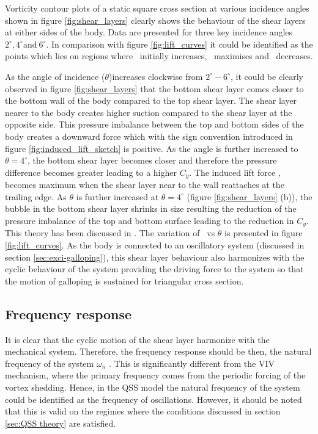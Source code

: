 Vorticity contour plots of a static square cross section at various incidence angles shown in figure \ref{fig:shear_layers} clearly shows the behaviour of the shear layers at either sides of the body. Data are presented for three key incidence angles $2^{\circ}, 4^{\circ} \text{and}\ 6^{\circ}$. In comparison with figure \ref{fig:lift_curves} it could be identified as the points which lies on regions where \cy\ initially increases, \cy\ maximises and \cy\ decreases. 

As the angle of incidence ($\theta$)increases clockwise from $2^{\circ}-6^{\circ}$, it could be clearly observed in figure \ref{fig:shear_layers} that the bottom shear layer comes closer to the bottom wall of the body compared to the top shear layer. The shear layer nearer to the body creates higher suction compared to the shear layer at the opposite side. This pressure imbalance between the top and bottom sides of the body creates a downward force which with the sign convention introduced in figure \ref{fig:induced_lift_sketch} is positive. As the angle is further increased to $\theta=4^{\circ}$, the bottom shear layer becomes closer and therefore the pressure difference becomes greater leading to a higher $C_{y}$. The induced lift force \cy, becomes maximum when the shear layer near to the wall reattaches at the trailing edge. As $\theta$ is further increased at  $\theta=4^{\circ}$ (figure \ref{fig:shear_layers} (b)), the bubble in the bottom shear layer shrinks in size resulting the reduction of the pressure imbalance of the top and bottom surface leading to the reduction in $C_{y}$. This theory has been discussed in \citet{Parkinson1989}. The variation of \cy\ vs $\theta$ is presented in figure \ref{fig:lift_curves}. As the body is connected to an oscillatory system (discussed in section \ref{sec:exci-galloping}), this shear layer behaviour also harmonizes with the cyclic behaviour of the system providing the driving force to the system so that the motion of galloping is sustained for triangular cross section.



\subsection{Frequency response}
 
 It is clear that the cyclic motion of the shear layer harmonize with the mechanical system. Therefore, the frequency response should be then, the natural frequency of the system $\omega_{n}$ \citep{Paidoussis2010}. This is significantly different from the VIV mechanism, where the primary frequency comes from the periodic forcing of the vortex shedding. Hence, in the QSS model the natural frequency of the system could be identified as the frequency of oscillations. However, it should be  noted that this is valid on the regimes where the conditions discussed in section \ref{sec:QSS theory} are satisfied. 
 
